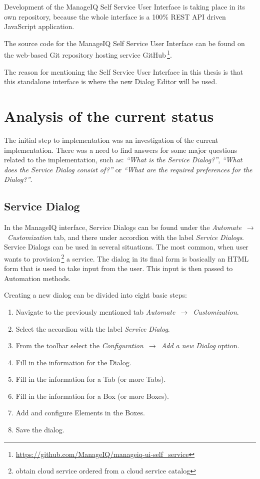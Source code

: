 Development of the ManageIQ Self Service User Interface is taking place in its
own repository, because the whole interface is a 100\% REST API driven
JavaScript application.

The source code for the ManageIQ Self Service User Interface can be found on
the web-based Git repository hosting service
GitHub\,\footnote{\url{https://github.com/ManageIQ/manageiq-ui-self\_service}}.

The reason for mentioning the Self Service User Interface in this thesis is
that this stand\-alone interface is where the new Dialog Editor will be used.

\chapter{Analysis of the current status}\label{ch:analysis}

The initial step to implementation was an investigation of the current
implementation.
There was a need to find answers for some major questions related to the
implementation, such as:
{\it``What is the Service Dialog?''},
{\it``What does the Service Dialog consist of?''} or
{\it``What are the required preferences for the Dialog?''}.

\section{Service Dialog}\label{sec:service-dialog}

In the ManageIQ interface, Service Dialogs can be found under the
{\it Automate}~$\rightarrow$~{\it Customization} tab, and there under accordion
with the label {\it Service Dialogs}.
Service Dialogs can be used in several situations. The most
common, when user wants to provision\,\footnote{obtain cloud service
ordered from a cloud service catalog} a service.
The dialog in its final form is basically an HTML form that is used to take
input from the user. This input is then passed to Automation methods.

Creating a new dialog can be divided into eight basic steps:

\begin{enumerate}
  \item Navigate to the previously mentioned tab {\it Automate}~$\rightarrow$~{\it Customization}.
  \item Select the accordion with the label {\it Service Dialog}.
  \item From the toolbar select the {\it Configuration}~$\rightarrow$~{\it Add a new Dialog} option.
  \item Fill in the information for the Dialog.
  \item Fill in the information for a Tab (or more Tabs).
  \item Fill in the information for a Box (or more Boxes).
  \item Add and configure Elements in the Boxes.
  \item Save the dialog.
\end{enumerate}

